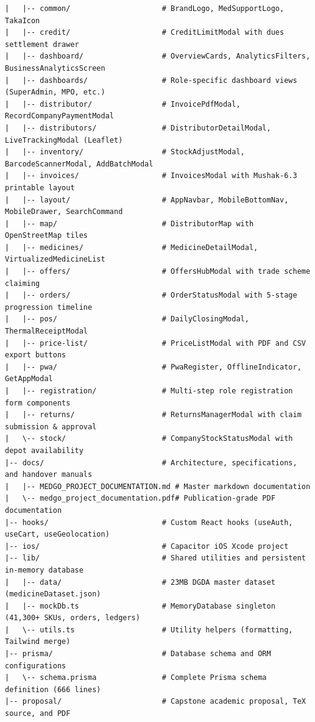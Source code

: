 \documentclass[10pt,a4paper]{article}
\begin{document}
\begin{verbatim}
|   |-- common/                     # BrandLogo, MedSupportLogo, TakaIcon
|   |-- credit/                     # CreditLimitModal with dues settlement drawer
|   |-- dashboard/                  # OverviewCards, AnalyticsFilters, BusinessAnalyticsScreen
|   |-- dashboards/                 # Role-specific dashboard views (SuperAdmin, MPO, etc.)
|   |-- distributor/                # InvoicePdfModal, RecordCompanyPaymentModal
|   |-- distributors/               # DistributorDetailModal, LiveTrackingModal (Leaflet)
|   |-- inventory/                  # StockAdjustModal, BarcodeScannerModal, AddBatchModal
|   |-- invoices/                   # InvoicesModal with Mushak-6.3 printable layout
|   |-- layout/                     # AppNavbar, MobileBottomNav, MobileDrawer, SearchCommand
|   |-- map/                        # DistributorMap with OpenStreetMap tiles
|   |-- medicines/                  # MedicineDetailModal, VirtualizedMedicineList
|   |-- offers/                     # OffersHubModal with trade scheme claiming
|   |-- orders/                     # OrderStatusModal with 5-stage progression timeline
|   |-- pos/                        # DailyClosingModal, ThermalReceiptModal
|   |-- price-list/                 # PriceListModal with PDF and CSV export buttons
|   |-- pwa/                        # PwaRegister, OfflineIndicator, GetAppModal
|   |-- registration/               # Multi-step role registration form components
|   |-- returns/                    # ReturnsManagerModal with claim submission & approval
|   \-- stock/                      # CompanyStockStatusModal with depot availability
|-- docs/                           # Architecture, specifications, and handover manuals
|   |-- MEDGO_PROJECT_DOCUMENTATION.md # Master markdown documentation
|   \-- medgo_project_documentation.pdf# Publication-grade PDF documentation
|-- hooks/                          # Custom React hooks (useAuth, useCart, useGeolocation)
|-- ios/                            # Capacitor iOS Xcode project
|-- lib/                            # Shared utilities and persistent in-memory database
|   |-- data/                       # 23MB DGDA master dataset (medicineDataset.json)
|   |-- mockDb.ts                   # MemoryDatabase singleton (41,300+ SKUs, orders, ledgers)
|   \-- utils.ts                    # Utility helpers (formatting, Tailwind merge)
|-- prisma/                         # Database schema and ORM configurations
|   \-- schema.prisma               # Complete Prisma schema definition (666 lines)
|-- proposal/                       # Capstone academic proposal, TeX source, and PDF

\end{verbatim}
\end{document}
